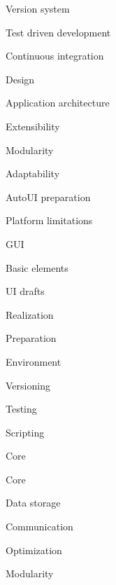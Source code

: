 \secc Version system


\secc Test driven development


\secc Continuous integration



\chap Design


\sec Application architecture


\secc Extensibility


\secc Modularity


\secc Adaptability


\secc AutoUI preparation


\secc Platform limitations


\sec GUI


\secc Basic elements


\secc UI drafts


\chap Realization


\sec Preparation


\secc Environment


\secc Versioning


\secc Testing


\secc Scripting


\sec Core


\secc Core


\secc Data storage


\secc Communication


\secc Optimization


\sec Modularity


